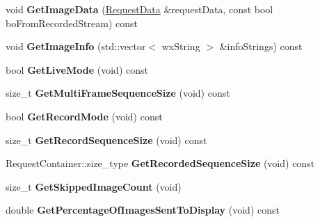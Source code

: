 \begin{DoxyCompactItemize}
\item 
\hypertarget{class_capture_thread_a76e35f11ebeb4a63fe01f4b20dd107da}{void {\bfseries Get\+Image\+Data} (\hyperlink{struct_request_data}{Request\+Data} \&request\+Data, const bool bo\+From\+Recorded\+Stream) const }\label{class_capture_thread_a76e35f11ebeb4a63fe01f4b20dd107da}

\item 
\hypertarget{class_capture_thread_adfa2d88afa3a07e6db6b74adcedfc54d}{void {\bfseries Get\+Image\+Info} (std\+::vector$<$ wx\+String $>$ \&info\+Strings) const }\label{class_capture_thread_adfa2d88afa3a07e6db6b74adcedfc54d}

\item 
\hypertarget{class_capture_thread_a033f5278ba0358e00316fd5df325e294}{bool {\bfseries Get\+Live\+Mode} (void) const }\label{class_capture_thread_a033f5278ba0358e00316fd5df325e294}

\item 
\hypertarget{class_capture_thread_a1350950434dda89bc417eb9145fad76a}{size\+\_\+t {\bfseries Get\+Multi\+Frame\+Sequence\+Size} (void) const }\label{class_capture_thread_a1350950434dda89bc417eb9145fad76a}

\item 
\hypertarget{class_capture_thread_a370420c885ff8571abb6ce1495b1fcd1}{bool {\bfseries Get\+Record\+Mode} (void) const }\label{class_capture_thread_a370420c885ff8571abb6ce1495b1fcd1}

\item 
\hypertarget{class_capture_thread_ada397f67e741acfac452ff7233113960}{size\+\_\+t {\bfseries Get\+Record\+Sequence\+Size} (void) const }\label{class_capture_thread_ada397f67e741acfac452ff7233113960}

\item 
\hypertarget{class_capture_thread_a5e2fe7801261917e56a0f6b730c560aa}{Request\+Container\+::size\+\_\+type {\bfseries Get\+Recorded\+Sequence\+Size} (void) const }\label{class_capture_thread_a5e2fe7801261917e56a0f6b730c560aa}

\item 
\hypertarget{class_capture_thread_a59f3789a6fff136a4d9867e4e622e9f3}{size\+\_\+t {\bfseries Get\+Skipped\+Image\+Count} (void)}\label{class_capture_thread_a59f3789a6fff136a4d9867e4e622e9f3}

\item 
\hypertarget{class_capture_thread_ad1009a1bb42306a9c8f63813aa6f20c1}{double {\bfseries Get\+Percentage\+Of\+Images\+Sent\+To\+Display} (void) const }\label{class_capture_thread_ad1009a1bb42306a9c8f63813aa6f20c1}


\end{DoxyCompactItemize}
